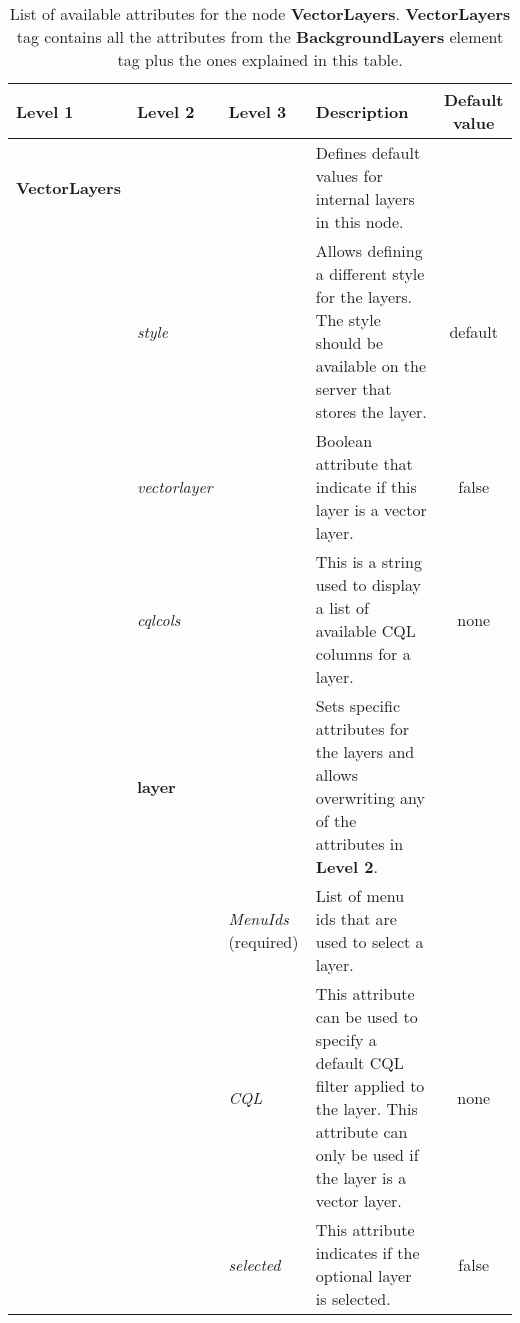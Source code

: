 \begin{table*}[h]
     \centering
     \caption{List of available attributes for the node \textbf{VectorLayers}. 
     \textbf{VectorLayers} tag contains all the attributes from the \textbf{BackgroundLayers} element tag plus
 the ones explained in this table.}
     \begin{tabularx}{490pt}{|l|l|l|X|c|}
         \hline
         \textbf{Level 1} & \textbf{Level 2} & \textbf{Level 3} & \textbf{Description} & \textbf{Default value} \\
         \hline
         \textbf{VectorLayers} &&& Defines default values for internal layers in this node.& \\
         &   \emph{style}&& Allows defining a different style for the layers. 
         The style should be available on the server that stores the layer.& default \\
         &   \emph{vectorlayer}&& Boolean attribute that indicate if this
         layer is a vector layer.& false \\
         &   \emph{cqlcols}&& This is a string used to display a list of available CQL columns 
                for a layer. & none\\
         & \textbf{layer} && Sets specific attributes for the layers and 
                 allows overwriting any of the attributes in \textbf{Level 2}. &\\
         &&   \emph{MenuIds} (required)& List of menu ids that are used to select a layer. & \\
         &&   \emph{CQL} & This attribute can be used to specify a default CQL filter
         applied to the layer. This attribute can only be used if the layer is a vector layer. & none \\
         &&   \emph{selected} & This attribute indicates if the optional layer is
         selected. & false\\
         \hline
     \end{tabularx}
     \label{tab:schema2}
 \end{table*}

